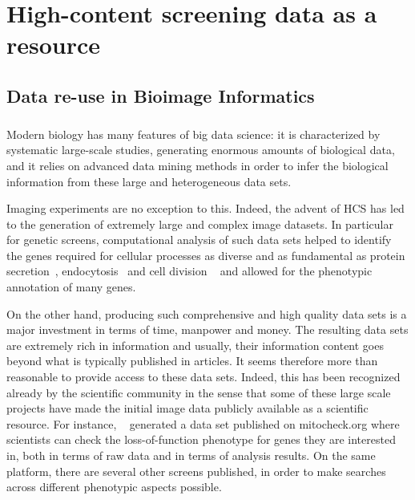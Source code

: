 
\chapter{High-content screening data as a resource}
\label{chap:reuse}
\section{Data re-use in Bioimage Informatics}
\paragraph*{}

Modern biology has many features of big data science: it is
characterized by systematic large-scale studies, generating enormous
amounts of biological data, and it relies on advanced data mining
methods in order to infer the biological information from these large
and heterogeneous data sets. 

Imaging experiments are no exception to this. Indeed, the advent of
HCS has led to the generation of extremely large and
complex image datasets. In particular for genetic screens,
computational analysis of such data sets helped to identify the genes
required for cellular processes as diverse and as fundamental as 
protein secretion~\cite{simpson2012genome},
endocytosis~\cite{collinet2010systems} and cell division
~\cite{pmid20360735} and allowed for the phenotypic annotation of many
genes.  

On the other hand, producing such comprehensive and high quality data
sets is a major investment in terms of time, manpower and money. The
resulting data sets are extremely rich in information and usually,
their information content goes beyond what is typically published in
articles. It seems therefore more than reasonable to provide access to
these data sets. 
Indeed, this has been recognized already by the
scientific community in the sense that some of these large scale
projects have made the initial image data publicly available as a
scientific resource. For instance, ~\cite{pmid20360735} generated a
data set published on mitocheck.org where scientists can check the
loss-of-function phenotype for genes they are interested in, both in
terms of raw data and in terms of analysis results. On the same
platform, there are several other screens published, in order to make
searches across different phenotypic aspects possible. 

